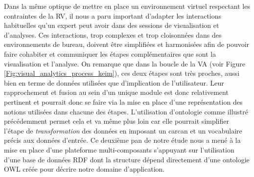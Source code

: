 Dans la même optique de mettre en place un environnement virtuel respectant les contraintes de la RV, il nous a paru important d'adapter les interactions habituelles qu'un expert peut avoir dans des sessions de visualisation et d'analyses. Ces interactions, trop complexes et trop cloisonnées dans des environnements de bureau, doivent être simplifiées et harmonisées afin de pouvoir faire cohabiter et communiquer les étapes complémentaires que sont la visualisation et l'analyse. On remarque que dans la boucle de la VA (voir Figure \ref{Fig:visual_analytics_process_keim}), ces deux étapes sont très proches, aussi bien en terme de données utilisées que d'implication de l'utilisateur. Leur rapprochement et fusion au sein d'un unique module est donc relativement pertinent et pourrait donc se faire via la mise en place d'une représentation des notions utilisées dans chacune des étapes. L'utilisation d'ontologie comme illustré précédemment permet cela et va même plus loin car elle pourrait simplifier l'étape de \textit{transformation} des données en imposant un carcan et un vocabulaire précis aux données d'entrée. Ce deuxième pan de notre étude nous a mené à la mise en place d'une plateforme multi-composants s'appuyant sur l'utilisation d'une base de données RDF dont la structure dépend directement d'une ontologie OWL créée pour décrire notre domaine d'application.



